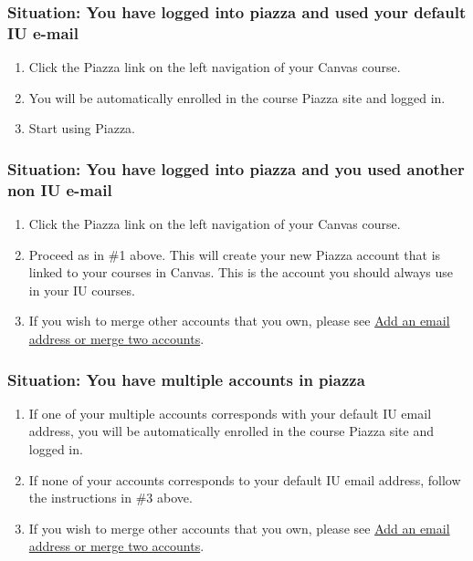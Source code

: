 \subsubsection{Situation: You have logged into piazza and used your
  default IU e-mail}

\begin{enumerate}
\item Click the Piazza link on the left navigation of your Canvas
  course.
\item You will be automatically enrolled in the course Piazza site and
  logged in.
\item Start using Piazza.
\end{enumerate}

\subsubsection{Situation: You have logged into piazza and you used
another non IU
e-mail}\label{situation-you-have-logged-into-piazza-and-you-used-another-non-iu-e-mail}

\begin{enumerate}
\item
  Click the Piazza link on the left navigation of your Canvas course.
\item
  Proceed as in \#1 above. This will create your new Piazza account that
  is linked to your courses in Canvas. This is the account you should
  always use in your IU courses.
\item
  If you wish to merge other accounts that you own, please see
  \href{https://www.google.com/url?q=http://support.piazza.com/customer/portal/articles/1646661-add-an-email-address-or-merge-two-accounts\&sa=D\&ust=1502127148503000\&usg=AFQjCNHyBFh3TMAtSDpFordYOfH0IE6kPA}{Add
  an email address or merge two accounts}.
\end{enumerate}

\subsubsection{Situation: You have multiple accounts in piazza}

\begin{enumerate}
\tightlist
\item
  If one of your multiple accounts corresponds with your default IU
  email address, you will be automatically enrolled in the course Piazza
  site and logged in.
\item
  If none of your accounts corresponds to your default IU email address,
  follow the instructions in \#3 above.
\item
  If you wish to merge other accounts that you own, please see
  \href{https://www.google.com/url?q=http://support.piazza.com/customer/portal/articles/1646661-add-an-email-address-or-merge-two-accounts\&sa=D\&ust=1502127148504000\&usg=AFQjCNHwO1kks2cnVLpWWCnOIEDFhl2fJA}{Add
  an email address or merge two accounts}.
\end{enumerate}

